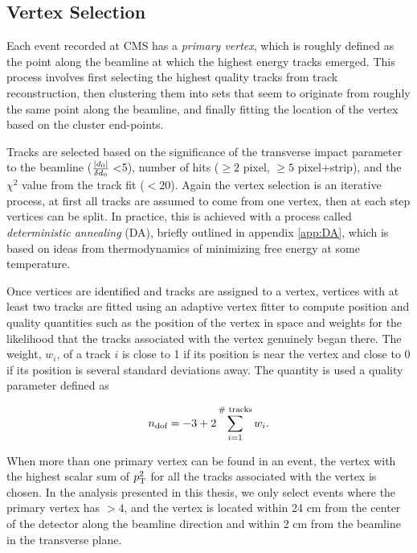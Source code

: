   \subsection{Vertex Selection} \label{sec:vertex_selection}
    Each event recorded at CMS has a \emph{primary vertex}, which is roughly defined as the point along the beamline at which the highest energy tracks emerged. This process involves first selecting the highest quality tracks from track reconstruction, then clustering them into sets that seem to originate from roughly the same point along the beamline, and finally fitting the location of the vertex based on the cluster end-points. 

    Tracks are selected based on the significance of the transverse impact parameter to the beamline ($\frac{\lvert d_0 \rvert}{\delta d_0}<$5), number of hits ($\ge 2$ pixel, $\ge 5$ pixel+strip), and the $\chi^2$ value from the track fit ($<20$). Again the vertex selection is an iterative process, at first all tracks are assumed to come from one vertex, then at each step vertices can be split. In practice, this is achieved with a process called \emph{deterministic annealing} (DA), briefly outlined in appendix \ref{app:DA}, which is based on ideas from thermodynamics of minimizing free energy at some temperature. 

    Once vertices are identified and tracks are assigned to a vertex, vertices with at least two tracks are fitted using an adaptive vertex fitter \cite{adaptive_vertex_fitter} to compute position and quality quantities such as the position of the vertex in space and weights for the likelihood that the tracks associated with the vertex genuinely began there. The weight, $w_i$, of a track $i$ is close to 1 if its position is near the vertex and close to 0 if its position is several standard deviations away. The quantity \ndof is used a quality parameter defined as

    \[
      n_{\text{dof}} = -3+2 \sum \limits_{i=1}^{\text{\# tracks}} w_i.
    \]

    When more than one primary vertex can be found in an event, the vertex with the highest scalar sum of $p_{\mathrm{T}}^2$ for all the tracks associated with the vertex is chosen. In the analysis presented in this thesis, we only select events where the primary vertex has \ndof $>4$, and the vertex is located within 24 cm from the center of the detector along the beamline direction and within 2 cm from the beamline in the transverse plane.

